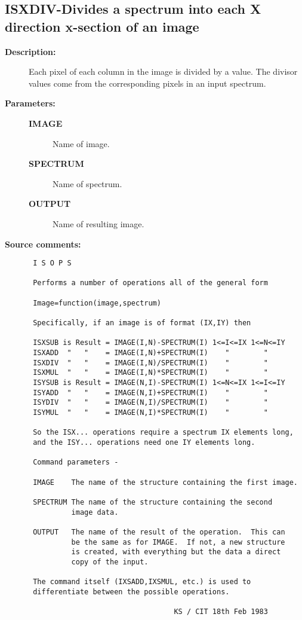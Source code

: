 \subsection{ISXDIV-\label{ISXDIV}Divides a spectrum into each X direction x-section of an image}
\begin{description}

\item [{\bf Description:}]
 Each pixel of each column in the image is divided by a value.
 The divisor values come from the corresponding pixels in an
 input spectrum.

\item [{\bf Parameters:}]
\begin{description}
\item [{\bf IMAGE}]
 Name of image.
\item [{\bf SPECTRUM}]
 Name of spectrum.
\item [{\bf OUTPUT}]
 Name of resulting image.
\end{description}

\item [{\bf Source comments:}]
\begin{verbatim}
 I S O P S

 Performs a number of operations all of the general form

 Image=function(image,spectrum)

 Specifically, if an image is of format (IX,IY) then

 ISXSUB is Result = IMAGE(I,N)-SPECTRUM(I) 1<=I<=IX 1<=N<=IY
 ISXADD  "   "    = IMAGE(I,N)+SPECTRUM(I)    "        "
 ISXDIV  "   "    = IMAGE(I,N)/SPECTRUM(I)    "        "
 ISXMUL  "   "    = IMAGE(I,N)*SPECTRUM(I)    "        "
 ISYSUB is Result = IMAGE(N,I)-SPECTRUM(I) 1<=N<=IX 1<=I<=IY
 ISYADD  "   "    = IMAGE(N,I)+SPECTRUM(I)    "        "
 ISYDIV  "   "    = IMAGE(N,I)/SPECTRUM(I)    "        "
 ISYMUL  "   "    = IMAGE(N,I)*SPECTRUM(I)    "        "

 So the ISX... operations require a spectrum IX elements long,
 and the ISY... operations need one IY elements long.

 Command parameters -

 IMAGE    The name of the structure containing the first image.

 SPECTRUM The name of the structure containing the second
          image data.

 OUTPUT   The name of the result of the operation.  This can
          be the same as for IMAGE.  If not, a new structure
          is created, with everything but the data a direct
          copy of the input.

 The command itself (IXSADD,IXSMUL, etc.) is used to
 differentiate between the possible operations.

                                  KS / CIT 18th Feb 1983
\end{verbatim}
\end{description}
